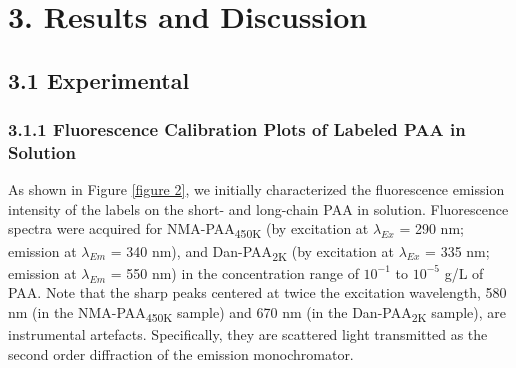 \documentclass[journal=mamobx,manuscript=article]{achemso}
\begin{document}
\section{3. Results and Discussion}   %
     \label{sec-results}

\subsection{3.1 Experimental}   %
    \label{sec-res-exp}

\subsubsection{3.1.1 Fluorescence Calibration Plots of Labeled PAA in Solution}   %
    \label{sec-fluocalib}

As shown in Figure \ref{figure 2}, we initially characterized the fluorescence emission intensity of the labels on the short- and long-chain PAA in solution.  Fluorescence spectra
were acquired for NMA-PAA\textsubscript{450K} (by excitation at $\lambda_{Ex}$ = 290 nm; emission at $\lambda_{Em}$ = 340 nm),\cite{Anghel1998} and Dan-PAA\textsubscript{2K} (by excitation at $\lambda_{Ex}$ = 335 nm; emission at $\lambda_{Em}$ = 550 nm)\cite{Bednar1985} in the concentration range of $10^{-1}$ to $10^{-5}$ g/L of PAA.  Note that the sharp peaks centered at twice the excitation wavelength, 580 nm (in the NMA-PAA\textsubscript{450K} sample) and 670 nm (in the Dan-PAA\textsubscript{2K} sample), are instrumental artefacts.  Specifically, they are scattered light transmitted as the second order diffraction of the emission monochromator. 
\end{document}
